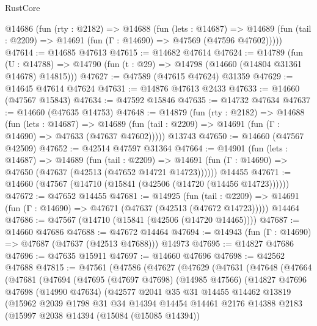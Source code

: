 \begin{lexlean}{RustCore}
\begin{coremodule}
  @14686
    (fun (rty : @2182) =>
    @14688
      (fun (lets : @14687) =>
      @14689 (fun (tail : @2209) => @14691 (fun (Γ : @14690) => @47569 (@47596 @47602)))))
@47614 := @14685 @47613
@47615 := @14682 @47614
@47624 := @14789
    (fun (U : @14788) => @14790 (fun (t : @29) => @14798 (@14660 (@14804 @31361 @14678) @14815)))
@47627 := @47589 (@47615 @47624) @31359
@47629 := @14645 @47614 @47624
@47631 := @14876 @47613 @2433
@47633 := @14660 (@47567 @15843)
@47634 := @47592 @15846
@47635 := @14732 @47634
@47637 := @14660 (@47635 @14753)
@47648 := @14879
    (fun (rty : @2182) =>
    @14688
      (fun (lets : @14687) =>
      @14689 (fun (tail : @2209) => @14691 (fun (Γ : @14690) => @47633 (@47637 @47602)))))
    @13743
@47650 := @14660 (@47567 @42509)
@47652 := @42514 @47597 @31364
@47664 := @14901
    (fun (lets : @14687) =>
    @14689
      (fun (tail : @2209) =>
      @14691 (fun (Γ : @14690) => @47650 (@47637 (@42513 (@47652 @14721 @14723))))))
    @14455
@47671 := @14660 (@47567 (@14710 (@15841 (@42506 (@14720 (@14456 @14723))))))
@47672 := @47652 @14455
@47681 := @14925
    (fun (tail : @2209) => @14691 (fun (Γ : @14690) => @47671 (@47637 (@42513 (@47672 @14723)))))
    @14464
@47686 := @47567 (@14710 (@15841 (@42506 (@14720 @14465))))
@47687 := @14660 @47686
@47688 := @47672 @14464
@47694 := @14943 (fun (Γ : @14690) => @47687 (@47637 (@42513 @47688))) @14973
@47695 := @14827 @47686
@47696 := @47635 @15911
@47697 := @14660 @47696
@47698 := @42562 @47688
@47815 := @47561
    (@47586
      (@47627
        (@47629
          (@47631
            (@47648
              (@47664
                (@47681
                  (@47694
                    (@47695
                      (@47697 @47698)
                      (@14985 @47566)
                      (@14827
                        @47696
                        @47698
                        (@14990 @47634)
                        (@42577
                          @2041
                          @35
                          @31
                          @14455
                          @14462
                          @13819
                          (@15962
                            @2039
                            @1798
                            @31
                            @34
                            @14394
                            @14454
                            @14461
                            @2176
                            @14388
                            @2183
                            (@15997
                              @2038
                              @14394
                              (@15084 (@15085 @14394))

\end{coremodule}
\end{lexlean}
